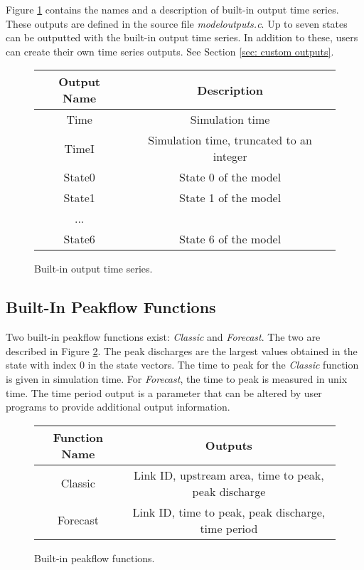 \documentclass[12pt]{article}
\begin{document}
Figure \ref{fig: built-in output time series} contains the names and a description of built-in output time series. These outputs are defined in the source file \emph{modeloutputs.c}. Up to seven states can be outputted with the built-in output time series. In addition to these, users can create their own time series outputs. See Section \ref{sec: custom outputs}.
\begin{figure}[ht]
 \centering
 \begin{tabular}{|c|c|}
  \hline
  Output Name & Description \\
  \hline
   Time  & Simulation time \\
   TimeI & Simulation time, truncated to an integer \\
   State0 & State 0 of the model \\
   State1 & State 1 of the model \\
   ... & \\
   State6 & State 6 of the model \\
   \hline
  \end{tabular}
 \caption{Built-in output time series.}
 \label{fig: built-in output time series}
\end{figure}

\subsection{Built-In Peakflow Functions} \label{sec: built-in peakflow functions}

Two built-in peakflow functions exist: \emph{Classic} and \emph{Forecast}. The two are described in Figure \ref{fig: built-in peakflow functions}. The peak discharges are the largest values obtained in the state with index 0 in the state vectors. The time to peak for the \emph{Classic} function is given in simulation time. For \emph{Forecast}, the time to peak is measured in unix time. The time period output is a parameter that can be altered by user programs to provide additional output information.
\begin{figure}[ht]
 \centering
 \begin{tabular}{|c|c|}
  \hline
  Function Name & Outputs \\
  \hline
  Classic  & Link ID, upstream area, time to peak, peak discharge \\
  Forecast & Link ID, time to peak, peak discharge, time period \\
  \hline
 \end{tabular}
 \caption{Built-in peakflow functions.}
 \label{fig: built-in peakflow functions}
\end{figure}
\end{document}
